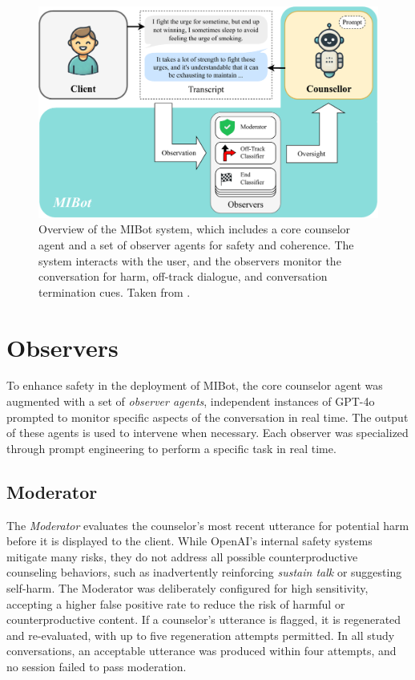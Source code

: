 


\begin{figure}[ht]
  \centering
  \includegraphics[width=0.9\linewidth]{fig/sysdiag.pdf} 
  \caption[Overview of the MIBot system]{Overview of the MIBot system, which includes a core counselor agent and a set of observer agents for safety and coherence. The system interacts with the user, and the observers monitor the conversation for harm, off-track dialogue, and conversation termination cues. Taken from \citet{mahmood-etal-2025-fully}.}
  \label{fig:sysdiag}
\end{figure}

\section{Observers}
\label{sec:observers}
To enhance safety in the deployment of MIBot, the core counselor agent was augmented with a set of \textit{observer agents}, independent instances of GPT-4o prompted to monitor specific aspects of the conversation in real time. The output of these agents is used to intervene when necessary. Each observer was specialized through prompt engineering to perform a specific task in real time.

\subsection{Moderator}
The \textit{Moderator} evaluates the counselor's most recent utterance for potential harm before it is displayed to the client. While OpenAI's internal safety systems mitigate many risks, they do not address all possible counterproductive counseling behaviors, such as inadvertently reinforcing \emph{sustain talk} or suggesting self-harm. The Moderator was deliberately configured for high sensitivity, accepting a higher false positive rate to reduce the risk of harmful or counterproductive content. If a counselor's utterance is flagged, it is regenerated and re-evaluated, with up to five regeneration attempts permitted. In all study conversations, an acceptable utterance was produced within four attempts, and no session failed to pass moderation.

